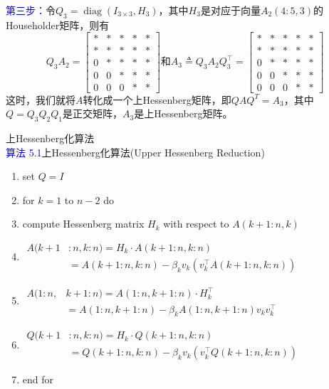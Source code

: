 \documentclass[12pt,a4paper]{article}
\begin{document}
\textcolor{blue}{第三步：}\quad 令$Q_{3}=\operatorname{diag}\left(I_{3 \times 3}, H_{3}\right)$，其中$H_3$是对应于向量$A_2(4:5,3)$的Householder矩阵，则有$$
Q_{3} A_{2}=\left[\begin{array}{ccccc}{*} & {*} &{*} &{*} & {*} \\ {*} & {*} &{*} &{*} & {*} \\ {0} & {*} &{*} & {*} &{*} \\ {0} & {0} & {*} &{*} & {*} \\ {0} & {0} & {0} & {*} &{*}\end{array}\right]
\text{和} A_{3} \triangleq Q_{3} A_{2} Q_{3}^{\top}=\left[\begin{array}{ccccc}{*} & {*} &{*} &{*} & {*} \\ {*} & {*} &{*} &{*} & {*} \\ {0} & {*} &{*} &{*} & {*} \\  {0} & {0} & {*} &{*} & {*} \\ {0} & {0} & {0} &{*} & {*}\end{array}\right]
$$
这时，我们就将$A$转化成一个上Hessenberg矩阵，即$QAQ^T=A_3$，其中$Q=Q_3Q_2Q_1$是正交矩阵，$A_3$是上Hessenberg矩阵。

上Hessenberg化算法\\
\textcolor{blue}{算法 5.1}\quad 上Hessenberg化算法(Upper Hessenberg Reduction)
\begin{enumerate}[1:]
	\item set $Q=I$
	\item for $k=1$ to $n-2$ do
	\item \quad compute Hessenberg matrix $H_k$ with respect to $A(k+1:n,k)$
	\item \quad $\begin{aligned} A(k+1& : n, k : n )=H_{k} \cdot A(k+1 : n, k : n) \\ &=A(k+1 : n, k : n)-\beta_{k} v_{k}\left(v_{k}^{\top} A(k+1 : n, k : n)\right) \end{aligned}$
	\item \quad $\begin{aligned} A(1 : n, &k+1 : n)=A(1 : n, k+1 : n) \cdot H_{k}^{\top}\\
	&=A(1 : n, k+1 : n)-\beta_{k} A(1 : n, k+1 : n) v_{k} v_{k}^{\top} \end{aligned}$
	\item \quad $\begin{aligned} Q(k+1& : n, k : n )=H_{k} \cdot Q(k+1 : n, k : n) \\ &=Q(k+1 : n, k : n)-\beta_{k} v_{k}\left(v_{k}^{\top} Q(k+1 : n, k : n)\right) \end{aligned}$
	\item end for
\end{enumerate}
\end{document}
